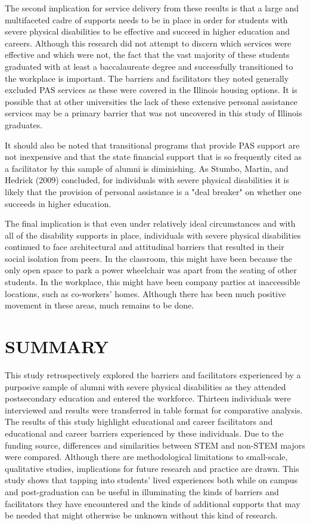 \documentclass[11.5pt]{sig-alternate} %
\begin{document}
\begin{large}
The second implication for service delivery from these results is that a large and multifaceted cadre of supports needs to be in place in order for students with severe physical disabilities to be effective and succeed in higher education and careers. Although this research did not attempt to discern which services were effective and which were not, the fact that the vast majority of these students graduated with at least a baccalaureate degree and successfully transitioned to the workplace is important. The barriers and facilitators they noted generally excluded PAS services as these were covered in the Illinois housing options. It is possible that at other universities the lack of these extensive personal assistance services may be a primary barrier that was not uncovered in this study of Illinois graduates. 

It should also be noted that transitional programs that provide PAS support are not inexpensive and that the state financial support that is so frequently cited as a facilitator by this sample of alumni is diminishing. As Stumbo, Martin, and Hedrick (2009) concluded, for individuals with severe physical disabilities it is likely that the provision of personal assistance is a "deal breaker" on whether one succeeds in higher education.

The final implication is that even under relatively ideal circumstances and with all of the disability supports in place, individuals with severe physical disabilities continued to face architectural and attitudinal barriers that resulted in their social isolation from peers. In the classroom, this might have been because the only open space to park a power wheelchair was apart from the seating of other students. In the workplace, this might have been company parties at inaccessible locations, such as co-workers' homes. Although there has been much positive movement in these areas, much remains to be done.

\section*{SUMMARY}
This study retrospectively explored the barriers and facilitators experienced by a purposive sample of alumni with severe physical disabilities as they attended postsecondary education and entered the workforce. Thirteen individuals were interviewed and results were transferred in table format for comparative analysis. The results of this study highlight educational and career facilitators and educational and career barriers experienced by these individuals. Due to the funding source, differences and similarities between STEM and non-STEM majors were compared. Although there are methodological limitations to small-scale, qualitative studies, implications for future research and practice are drawn. This study shows that tapping into students' lived experiences both while on campus and post-graduation can be useful in illuminating the kinds of barriers and facilitators they have encountered and the kinds of additional supports that may be needed that might otherwise be unknown without this kind of research.


\end{large}
\end{document}
